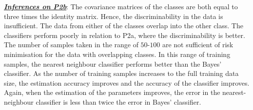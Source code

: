 \documentclass[12pt, a4 paper]{article}
\begin{document}
\underline {\it \bfseries Inferences on P2b}: The covariance matrices of the classes are both equal to three times the identity matrix. Hence, the discriminability in the data is insufficient. The data from either of the classes overlap into the other class. The classifiers perform poorly in relation to P2a, where the discriminability is better. The number of samples taken in the range of $50$-$100$ are not sufficient of risk minimisation for the data with overlapping classes. In this range of training samples, the nearest neighbour classifier performs better than the Bayes' classifier. As the number of training samples increases to the full training data size, the estimation accuracy improves and the accuracy of the classifier improves. Again, when the estimation of the parameters improves, the error in the nearest-neighbour classifier is less than twice the error in Bayes' classifier. \\
\end{document}
